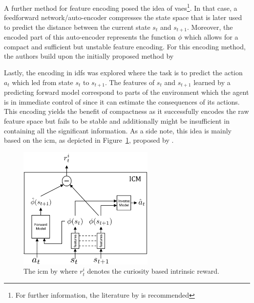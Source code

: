 \documentclass[draft,final]{vutinfth} %
\newcommand{\p}[1]{see p. #1}
\begin{document}
    A further method for feature encoding posed the idea of \glspl{vae}\footnote{For further information, the literature by \citet[\p{207-214}]{aggarwal_neural_2018} is recommended}.
    In that case, a feedforward network/auto-encoder compresses the state space that is later used to predict the distance between the current state $s_t$ and $s_{t+1}$.
    Moreover, the encoded part of this auto-encoder represents the function $\phi$ which allows for a compact and sufficient but unstable feature encoding.
    For this encoding method, the authors build upon the initially proposed method by~\citeauthor{stadie_incentivizing_2015}

    Lastly, the encoding in \glspl{idf} was explored where the task is to predict the action $a_t$ which led from state $s_t$ to $s_{t+1}$.
    The features of $s_t$ and $s_{t+1}$ learned by a predicting forward model correspond to parts of the environment which the agent is in immediate control of since it can estimate the consequences of its actions.
    This encoding yields the benefit of compactness as it successfully encodes the raw feature space but fails to be stable and additionally might be insufficient in containing all the significant information.
    As a side note, this idea is mainly based on the \gls{icm}, as depicted in Figure~\ref{fig:icm}, proposed by \citet{pathak_curiosity-driven_2017-1}.

    \begin{figure}[h]
        \centering
        \includegraphics[width=0.6\textwidth]{figures/icm.png}
        \caption[The \acrlong{icm} introduced in ""]{The \gls{icm} by \citet{pathak_curiosity-driven_2017-1} where $r_t^i$ denotes the curiosity based intrinsic reward.\protect\footnotemark}
        \label{fig:icm}
    \end{figure}
\end{document}
